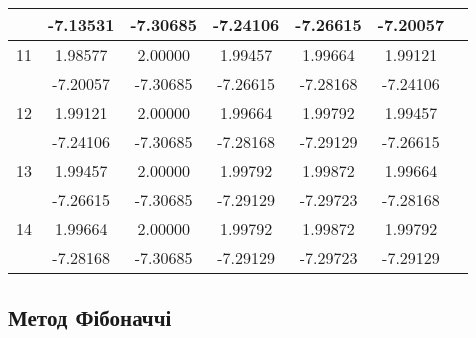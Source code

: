 \documentclass[14pt,a4paper]{extarticle}
\theoremstyle{definition}
\begin{document}
\begin{center}
\begin{longtable}{| l |*6{ c |}}
    & -7.13531 & -7.30685 & -7.24106 & -7.26615 & -7.20057 \\\hline
 11 &  1.98577 &  2.00000 &  1.99457 &  1.99664 &  1.99121 \\*
    & -7.20057 & -7.30685 & -7.26615 & -7.28168 & -7.24106 \\\hline
 12 &  1.99121 &  2.00000 &  1.99664 &  1.99792 &  1.99457 \\*
    & -7.24106 & -7.30685 & -7.28168 & -7.29129 & -7.26615 \\\hline
 13 &  1.99457 &  2.00000 &  1.99792 &  1.99872 &  1.99664 \\*
    & -7.26615 & -7.30685 & -7.29129 & -7.29723 & -7.28168 \\\hline
 14 &  1.99664 &  2.00000 &  1.99792 &  1.99872 &  1.99792 \\*
    & -7.28168 & -7.30685 & -7.29129 & -7.29723 & -7.29129 \\\hline
\end{longtable}
\end{center}

\subsection{Метод Фібоначчі}
\end{document}
